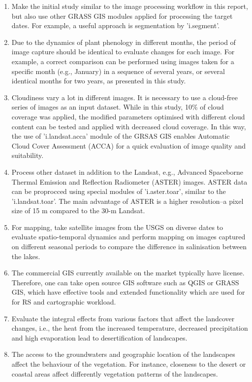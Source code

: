 \documentclass[environments,article,submit,pdftex,moreauthors]{Definitions/mdpi}
\begin{document}
\begin{enumerate}
	\item Make the initial study similar to the image processing workflow in this report, but also use other GRASS GIS modules applied for processing the target dates. For example, a useful approach is segmentation by 'i.segment'.
	\item Due to the  dynamics of plant phenology in different months, the period of image capture should be identical to evaluate changes for each image. For example, a correct comparison can be performed using images taken for a specific month (e.g., January) in a sequence of several years, or several identical months for two years, as presented in this study.
	\item Cloudiness vary a lot in different images. It is necessary to use a cloud-free series of images as an input dataset. While in this study, 10\% of cloud coverage was applied, the modified parameters optimised with different cloud content can be tested and applied with decreased cloud coverage. In this way, the use of 'i.landsat.acca' module of the GRSAS GIS enables Automatic Cloud Cover Assessment (ACCA) for a quick evaluation of image quality and suitability.
	\item Process other dataset in addition to the Landsat, e.g., Advanced Spaceborne Thermal Emission and Reflection Radiometer (ASTER) images. ASTER data can be proprocced using special modules of 'i.aster.toar', similar to the 'i.landsat.toar'. The main advantage of ASTER is a higher resolution--a pixel size of 15 m compared to the 30-m Landsat. 
	\item For mapping, take satellite images from the USGS on diverse dates to evaluate spatio-temporal dynamics and perform mapping on images captured on different seasonal periods to compare the difference in salinisation between the lakes.
	\item The  commercial GIS currently available on the market typically have license. Therefore, one can take open source GIS software such as QGIS or GRASS GIS, which have effective tools and extended functionality which are used for for RS and cartographic workload.
	\item Evaluate the integral effects from various factors that affect the landcover changes, i.e., the heat from the increased temperature, decreased precipitation and high evaporation lead to desertification of landscapes. 
	\item The access to the groundwaters and geographic location of the landscapes affect the behaviour of the vegetation. For instance, closeness to the desert or coastal areas affect differently vegetation patterns of the landscapes. 

\end{enumerate}
\end{document}
